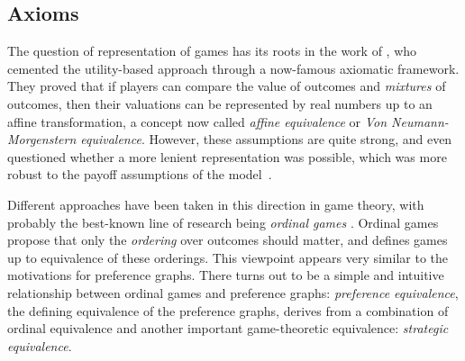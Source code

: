 \documentclass[preprint,authoryear]{elsarticle}
\begin{document}
\subsection{Axioms} \label{sec: axioms}

The question of representation of games has its roots in the work of \cite{von2007theory}, who cemented the utility-based approach through a now-famous axiomatic framework. They proved that if players can compare the value of outcomes and \emph{mixtures} of outcomes, then their valuations can be represented by real numbers up to an affine transformation, a concept now called \emph{affine equivalence} or \emph{Von Neumann-Morgenstern equivalence}. However, these assumptions are quite strong, and even \citeauthor{von2007theory} questioned whether a more lenient representation was possible, which was more robust to the payoff assumptions of the model~\citep[Ch. 3]{von2007theory}.

Different approaches have been taken in this direction in game theory, with probably the best-known line of research being \emph{ordinal games} \citep{cruz_ordinal_2000,durieu2008ordinal}. Ordinal games propose that only the \emph{ordering} over outcomes should matter, and defines games up to equivalence of these orderings.  This viewpoint appears very similar to the motivations for preference graphs. There turns out to be a simple and intuitive relationship between ordinal games and preference graphs: \emph{preference equivalence}, the defining equivalence of the preference graphs, derives from a combination of ordinal equivalence and another important game-theoretic equivalence: \emph{strategic equivalence}.




\end{document}

